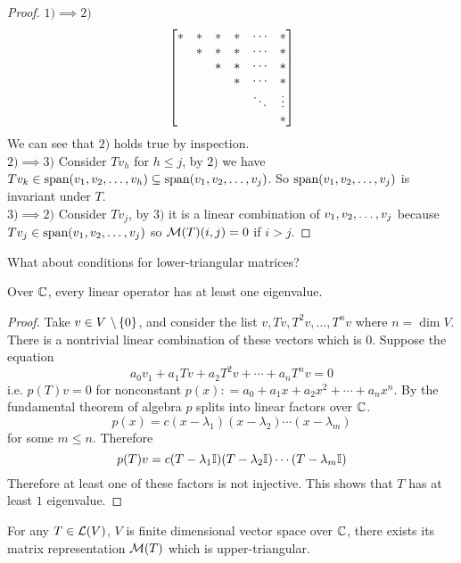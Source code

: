 \newpage
\begin{proof}
    $1) \implies 2) $ \[\begin{bmatrix} * & * & * & * & \cdots & * \\  & * & * & * & \cdots & * \\  &  & * & * & \cdots & * \\ & & & * & \cdots & * \\  & & & & \ddots & \vdots \\  & & & & & * \end{bmatrix}\] We can see that $2)$ holds true by inspection. \\
    $2) \implies 3)$ Consider $Tv_h$ for $h \leq j$, by $2)$ we have $Tv_k \in \text{span}({v}_1,{v}_2, \ldots, {v}_{h}) \subseteq \text{span} ({v}_1,{v}_2, \ldots, {v}_{j})$. So $\text{span} ({v}_1,{v}_2, \ldots, {v}_{j})$ is invariant under $T$. \\
    $3) \implies 2)$ Consider $Tv_j$, by $3)$ it is a linear combination of ${v}_1,{v}_2, \ldots, {v}_{j}$ because $Tv_j \in \text{span}({v}_1,{v}_2, \ldots, {v}_{j})$ so $\mathcal M(T)(i,j) = 0$ if $i > j$.
\end{proof}
\begin{question}
    What about conditions for lower-triangular matrices?
\end{question}
\begin{lemma}
Over $\mathbb C$, every linear operator has at least one eigenvalue.
\end{lemma}
\begin{proof}
    Take $v \in V\ \backslash \left\{ 0 \right\}$, and consider the list $v, Tv, T^2v, \ldots, T^nv$ where $n = \dim V$. There is a nontrivial linear combination of these vectors which is $0$. Suppose the equation \[a_0v_1 + a_1Tv + a_2T^2v + \cdots + a_nT^nv = 0\]
    i.e. $p(T)v = 0$ for nonconstant $p(x) : = a_0 + a_1x + a_2x^2 + \cdots + a_nx^n$. By the fundamental theorem of algebra $p$ splits into linear factors over $\mathbb C$.
    \[ p(x) = c(x - \lambda_1)(x - \lambda_2) \cdots (x - \lambda_m)\] for some $m \leq n$. Therefore 
    \[ p(T)v = c(T - \lambda_1 \mathbb I)(T - \lambda_2  \mathbb I) \cdots (T - \lambda_m \mathbb I)\]
    Therefore at least one of these factors is not injective. This shows that $T$ has at least $1$ eigenvalue.
\end{proof}
\begin{theorem}
    For any $T \in \mathcal L(V)$, $V$ is finite dimensional vector space over $\mathbb C$, there exists its matrix representation $\mathcal M(T)$ which is upper-triangular.
\end{theorem}
\newpage
